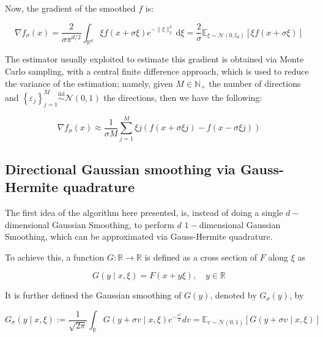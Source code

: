 Now, the gradient of the smoothed $f$ is:

\begin{equation}
    \nabla f_{\sigma}(x)=\frac{2}{\sigma \pi^{d / 2}} \int_{\mathbb{R}^{d}} \xi f(x+\sigma \xi) e^{-\|\xi\|_{2}^{2}} \mathrm{~d} \xi=\frac{2}{\sigma} \mathbb{E}_{\xi \sim \mathcal{N}\left(0, \mathbb{I}_{d}\right)}[\xi f(x+\sigma \xi)]
\end{equation}

The estimator usually exploited to estimate this gradient is obtained via Monte Carlo sampling, with a central finite difference approach, which is used to reduce the variance of the estimation; namely, given $M \in \mathbb{N}_+$ the number of directions and $\left\{\varepsilon_{j}\right\}_{j=1}^{M} \stackrel{\mathrm{iid}}{\sim} \mathcal{N}(0,1)$ the directions, then we have the following:

\begin{defn}\label{GradientGaussianSmoothingDefn}

	\begin{equation}
	    \nabla f_{\sigma}(x) \approx \frac{1}{\sigma M} \sum_{j=1}^{M} \xi{j}\left(f\left(x+\sigma \xi{j}\right)-f\left(x-\sigma \xi{j}\right)\right)
	\end{equation}

\end{defn}

\subsection{Directional Gaussian smoothing via Gauss-Hermite quadrature}

The first idea of the algorithm here presented, is, instead of doing a single $d-$dimensional Gaussian Smoothing, to perform $d$ $1-$dimensional Gaussian Smoothing, which can be approximated via Gauss-Hermite quadrature. 

To achieve this, a function $G:\mathbb{R} \rightarrow \mathbb{R}$ is defined as a cross section of $F$ along $\xi$ as

\begin{equation}
 G(y \mid x, \xi)=F(x+y \xi), \quad y \in \mathbb{R} 
\end{equation}

It is further defined the Gaussian smoothing of $G(y)$, denoted by $G_\sigma (y)$, by

\begin{equation}
 G_{\sigma}(y \mid x, \xi):=\frac{1}{\sqrt{2 \pi}} \int_{\mathbb{R}} G(y+\sigma v \mid x, \xi) \mathrm{c}^{-\frac{r^{2}}{2}} d v=\mathbb{E}_{v \sim \mathcal{N}(0,1)}[G(y+\sigma v \mid x, \xi)] 
\end{equation}

